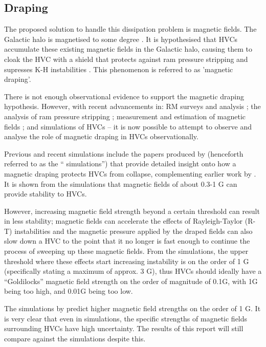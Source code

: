 \subsection{Draping}
\label{ssec:draping}

The proposed solution to handle this dissipation problem is magnetic fields. The Galactic halo is magnetised to some degree \citep{ID30, ID16, ID4, ID42}. It is hypothesised that HVCs accumulate these existing magnetic fields in the Galactic halo, causing them to cloak the HVC with a shield that protects against ram pressure stripping and supresses K-H instabilities \citep{ID10, ID11, ID13, ID23, ID24, ID34, ID51}. This phenomenon is referred to as 'magnetic draping'.


There is not enough observational evidence to support the magnetic draping hypothesis. However, with recent advancements in: RM surveys and analysis \citep{ID52, ID71, ID1, ID3, ID6, ID18, ID43, ID44, ID45}; the analysis of ram pressure stripping \citep{ID11, ID23, ID33}; measurement and estimation of magnetic fields \citep{ID5, ID23, ID30, ID11, ID26, ID21}; and simulations of HVCs \citep{ID13, ID23, ID24, ID33, ID34} – it is now possible to attempt to observe and analyse the role of magnetic draping in HVCs observationally.


Previous and recent simulations include the papers produced by \cite{ID23, ID24, ID33} (henceforth referred to as the “\citeauthor{ID23} simulations”) that provide detailed insight onto how a magnetic draping protects HVCs from collapse, complementing earlier work by \cite{ID13, ID11}. It is shown from the \citeauthor{ID23} simulations that magnetic fields of about 0.3-1 {\textmu}G can provide stability to HVCs.


However, increasing magnetic field strength beyond a certain threshold can result in less stability; magnetic fields can accelerate the effects of Rayleigh-Taylor (R-T) instabilities and the magnetic pressure applied by the draped fields can also slow down a HVC to the point that it no longer is fast enough to continue the process of sweeping up these magnetic fields. From the \citeauthor{ID23} simulations, the upper threshold where these effects start increasing instability is on the order of 1 {\textmu}G (specifically stating a maximum of approx. 3 {\textmu}G), thus HVCs should ideally have a “Goldilocks” magnetic field strength on the order of magnitude of 0.1{\textmu}G, with 1{\textmu}G being too high, and 0.01{\textmu}G being too low.


The simulations by \cite{ID34} predict higher magnetic field strengths on the order of 1 \textmu G. It is very clear that even in simulations, the specific strengths of magnetic fields surrounding HVCs have high uncertainty. The results of this report will still compare against the \citeauthor{ID23} simulations despite this.


